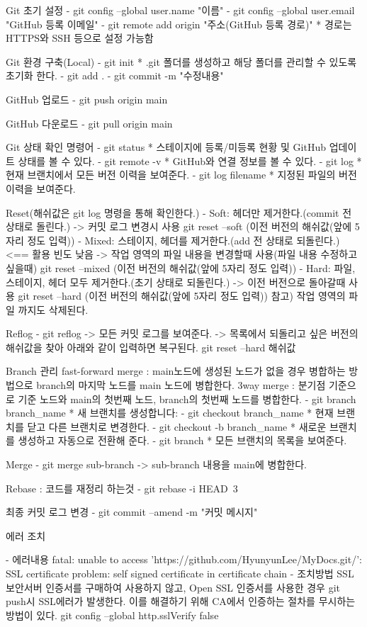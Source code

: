 
Git 초기 설정
  - git config --global user.name "이름"
  - git config --global user.email "GitHub 등록 이메일"
  - git remote add origin "주소(GitHub 등록 경로)"
    * 경로는 HTTPS와 SSH 등으로 설정 가능함

Git 환경 구축(Local)
  - git init 
    * .git 폴더를 생성하고 해당 폴더를 관리할 수 있도록 초기화 한다.
  - git add .
  - git commit -m "수정내용"

GitHub 업로드
  - git push origin main

GitHub 다운로드
  - git pull origin main

Git 상태 확인 명령어
  - git status
    * 스테이지에 등록/미등록 현황 및 GitHub 업데이트 상태를 볼 수 있다.
  - git remote -v 
    * GitHub와 연결 정보를 볼 수 있다.
  - git log
    * 현재 브랜치에서 모든 버전 이력을 보여준다.
  - git log filename
    * 지정된 파일의 버전 이력을 보여준다.

Reset(해쉬값은 git log 명령을 통해 확인한다.)
  - Soft: 헤더만 제거한다.(commit 전 상태로 돌린다.)
    -> 커밋 로그 변경시 사용
    git reset --soft (이전 버전의 해쉬값(앞에 5자리 정도 입력))
  - Mixed: 스테이지, 헤더를 제거한다.(add 전 상태로 되돌린다.)   <== 활용 빈도 낮음
    -> 작업 영역의 파일 내용을 변경할때 사용(파일 내용 수정하고 싶을때)
    git reset --mixed (이전 버전의 해쉬값(앞에 5자리 정도 입력))
  - Hard: 파일, 스테이지, 헤더 모두 제거한다.(초기 상태로 되돌린다.)
    -> 이전 버전으로 돌아갈때 사용
    git reset --hard (이전 버전의 해쉬값(앞에 5자리 정도 입력))
    참고) 작업 영역의 파일 까지도 삭제된다.

Reflog
  - git reflog
    -> 모든 커밋 로그를 보여준다.
    -> 목록에서 되돌리고 싶은 버전의 해쉬값을 찾아 아래와 같이 입력하면 복구된다.
       git reset --hard 해쉬값

Branch 관리
fast-forward merge : main노드에 생성된 노드가 없을 경우 병합하는 방법으로 branch의 마지막 노드를 main 노드에 병합한다.
3way merge : 분기점 기준으로 기준 노드와 main의 첫번째 노드, branch의 첫번째 노드를 병합한다.
  - git branch branch_name
    * 새 브랜치를 생성합니다:
  - git checkout branch_name
    * 현재 브랜치를 닫고 다른 브랜치로 변경한다.
  - git checkout -b branch_name
    * 새로운 브랜치를 생성하고 자동으로 전환해 준다.
  - git branch
    * 모든 브랜치의 목록을 보여준다.

Merge
  - git merge sub-branch
    -> sub-branch 내용을 main에 병합한다.

Rebase : 코드를 재정리 하는것
  - git rebase -i HEAD~3

최종 커밋 로그 변경
  - git commit --amend -m "커밋 메시지"

에러 조치

- 에러내용 
   fatal: unable to access 'https://github.com/HyunyunLee/MyDocs.git/': SSL certificate problem: self signed certificate in certificate chain
- 조치방법
   SSL 보안서버 인증서를 구매하여 사용하지 않고, Open SSL 인증서를 사용한 경우 git push시 SSL에러가 발생한다.
   이를 해결하기 위해 CA에서 인증하는 절차를 무시하는 방법이 있다.
   git config --global http.sslVerify false
